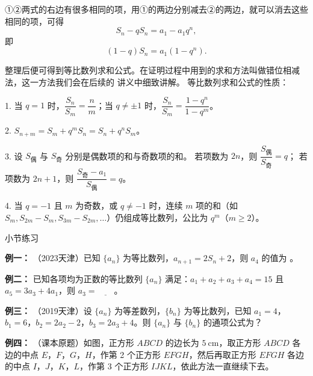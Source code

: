 \documentclass{article}
\begin{document}
①②两式的右边有很多相同的项，用①的两边分别减去②的两边，就可以消去这些相同的项，可得
\[
S_n - qS_n = a_1 - a_1 q^n,
\]
即
\[
(1 - q)S_n = a_1(1 - q^n).
\]

整理后便可得到等比数列求和公式。在证明过程中用到的求和方法叫做错位相减法，这一方法我们会在后续的
讲义中细致讲解。
\vspace{1\baselineskip}
等比数列求和公式的性质：

1. 当 \(q = 1\) 时，\(\dfrac{S_n}{S_m} = \dfrac{n}{m}\)；当 \(q \neq \pm 1\) 时，\(\dfrac{S_n}{S_m} = \dfrac{1 - q^n}{1 - q^m}\)。
\vspace{1\baselineskip}

2. \(S_{n+m} = S_m + q^m S_n = S_n + q^n S_m\)。
\vspace{1\baselineskip}

3. 设 \(S_{\text{偶}}\) 与 \(S_{\text{奇}}\) 分别是偶数项的和与奇数项的和。
若项数为 \(2n\)，则 \(\dfrac{S_{\text{偶}}}{S_{\text{奇}}} = q\)；
若项数为 \(2n+1\)，则 \(\dfrac{S_{\text{奇}} - a_1}{S_{\text{偶}}} = q\)。
\vspace{1\baselineskip}

4. 当 \(q = -1\) 且 \(m\) 为奇数，或 \(q \neq -1\) 时，连续 \(m\) 项的和（如 \(S_m, S_{2m}-S_m, S_{3m}-S_{2m},\dots\)）仍组成等比数列，公比为 \(q^m\)（\(m \geqslant 2\)）。
\vspace{3\baselineskip}

\begin{center}
    小节练习
\end{center}

\noindent\textbf{例一： }（2023天津）已知 \(\{a_n\}\) 为等比数列，\(a_{n+1} = 2S_n + 2\)，则 \(a_4\) 的值为 \underline{\quad\quad}。
\vspace{2\baselineskip}

\noindent\textbf{例二： }已知各项均为正数的等比数列 \(\{a_n\}\) 满足：\(a_1 + a_2 + a_3 + a_4 = 15\) 且 \(a_5 = 3a_3 + 4a_1\)，则 \(a_3 = \underline{\quad\quad}\)。
\vspace{2\baselineskip}

\noindent\textbf{例三： }（2019天津）设 \(\{a_n\}\) 为等差数列，\(\{b_n\}\) 为等比数列，已知 \(a_1 = 4\)，\(b_1 = 6\)，\(b_2 = 2a_2 - 2\)，\(b_3 = 2a_3 + 4\)。则 \(\{a_n\}\) 与 \(\{b_n\}\) 的通项公式为？
\vspace{8\baselineskip}

\noindent\textbf{例四： } （课本原题）如图，正方形 \(ABCD\) 的边长为 \(5\ \mathrm{cm}\)，取正方形 \(ABCD\) 各边的中点 \(E\)，\(F\)，\(G\)，\(H\)，作第 2 个正方形 \(EFGH\)，然后再取正方形 \(EFGH\) 各边的中点 \(I\)，\(J\)，\(K\)，\(L\)，作第 3 个正方形 \(IJKL\)，依此方法一直继续下去。
\end{document}
